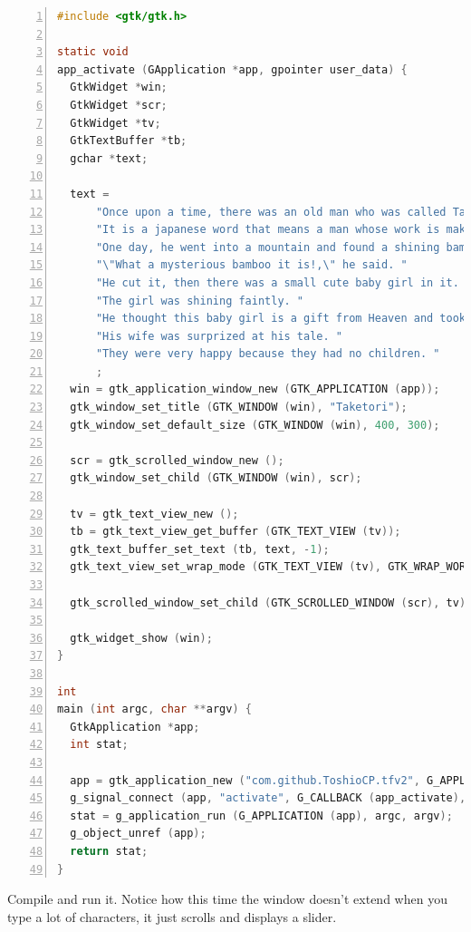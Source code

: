 \begin{lstlisting}[language=C, numbers=left]
#include <gtk/gtk.h>

static void
app_activate (GApplication *app, gpointer user_data) {
  GtkWidget *win;
  GtkWidget *scr;
  GtkWidget *tv;
  GtkTextBuffer *tb;
  gchar *text;

  text =
      "Once upon a time, there was an old man who was called Taketori-no-Okina. "
      "It is a japanese word that means a man whose work is making bamboo baskets.\n"
      "One day, he went into a mountain and found a shining bamboo. "
      "\"What a mysterious bamboo it is!,\" he said. "
      "He cut it, then there was a small cute baby girl in it. "
      "The girl was shining faintly. "
      "He thought this baby girl is a gift from Heaven and took her home.\n"
      "His wife was surprized at his tale. "
      "They were very happy because they had no children. "
      ;
  win = gtk_application_window_new (GTK_APPLICATION (app));
  gtk_window_set_title (GTK_WINDOW (win), "Taketori");
  gtk_window_set_default_size (GTK_WINDOW (win), 400, 300);

  scr = gtk_scrolled_window_new ();
  gtk_window_set_child (GTK_WINDOW (win), scr);

  tv = gtk_text_view_new ();
  tb = gtk_text_view_get_buffer (GTK_TEXT_VIEW (tv));
  gtk_text_buffer_set_text (tb, text, -1);
  gtk_text_view_set_wrap_mode (GTK_TEXT_VIEW (tv), GTK_WRAP_WORD_CHAR);

  gtk_scrolled_window_set_child (GTK_SCROLLED_WINDOW (scr), tv);

  gtk_widget_show (win);
}

int
main (int argc, char **argv) {
  GtkApplication *app;
  int stat;

  app = gtk_application_new ("com.github.ToshioCP.tfv2", G_APPLICATION_FLAGS_NONE);
  g_signal_connect (app, "activate", G_CALLBACK (app_activate), NULL);
  stat = g_application_run (G_APPLICATION (app), argc, argv);
  g_object_unref (app);
  return stat;
}
\end{lstlisting}

Compile and run it. Notice how this time the window doesn't extend when
you type a lot of characters, it just scrolls and displays a slider.
